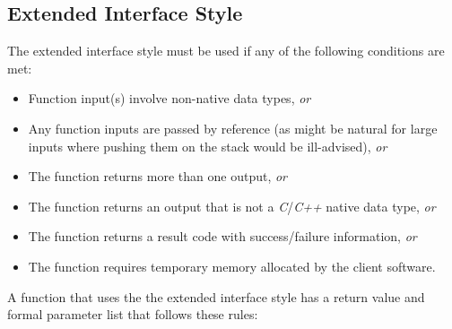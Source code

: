 \subsection{Extended Interface Style}
\label{cldd0:sfcp0:sefs0}

The extended interface style must be used if any of the
following conditions are met:

\begin{itemize}
\item Function input(s) involve non-native data types,
      \emph{or}
\item Any function inputs are passed by reference (as might
      be natural for large inputs where pushing them on the 
      stack would be ill-advised), \emph{or}
\item The function returns more than one output, \emph{or}
\item The function returns an output that is not a
      \emph{C}/\emph{C++} native data type, \emph{or}
\item The function returns a result code with
      success/failure information, \emph{or}
\item The function requires temporary memory
      allocated by the client software.
\end{itemize}

A function that uses the the extended interface style has a 
return value and formal parameter list that follows these 
rules: 

